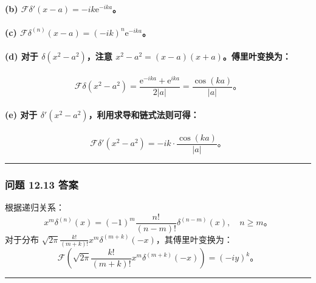 \paragraph{\texorpdfstring{(b)
$\mathcal{F}\delta'(x-a) = -i k \mathrm{e}^{-i k a}$。}{(b) \textbackslash mathcal\{F\}\textbackslash delta\textegsingle(x-a) = -i k \textbackslash mathrm\{e\}\^{}\{-i k a\}。}}

\paragraph{\texorpdfstring{(c)
$\mathcal{F}\delta^{(n)}(x-a) = (-i k)^n \mathrm{e}^{-i k a}$。}{(c) \textbackslash mathcal\{F\}\textbackslash delta\^{}\{(n)\}(x-a) = (-i k)\^{}n \textbackslash mathrm\{e\}\^{}\{-i k a\}。}}

\paragraph{\texorpdfstring{(d) 对于 $\delta(x^2-a^2)$，注意
$x^2-a^2 = (x-a)(x+a)$。傅里叶变换为：}{(d) 对于 \textbackslash delta(x\^{}2-a\^{}2)，注意 x\^{}2-a\^{}2 = (x-a)(x+a)。傅里叶变换为：}}
 $$
\mathcal{F}\delta(x^2-a^2) = \frac{\mathrm{e}^{-i k a} + \mathrm{e}^{i k a}}{2|a|} = \frac{\cos(k a)}{|a|}。
$$
\paragraph{\texorpdfstring{(e) 对于
$\delta'(x^2-a^2)$，利用求导和链式法则可得：}{(e) 对于 \textbackslash delta\textegsingle(x\^{}2-a\^{}2)，利用求导和链式法则可得：}}\label{e-ux5bf9ux4e8e-deltax2-a2ux5229ux7528ux6c42ux5bfcux548cux94feux5f0fux6cd5ux5219ux53efux5f97}
 $$
\mathcal{F}\delta'(x^2-a^2) = -i k \cdot \frac{\cos(k a)}{|a|}。
$$
\begin{center}\rule{0.5\linewidth}{0.5pt}\end{center}

\subsubsection{问题 12.13 答案}

根据递归关系：
 $$
x^m \delta^{(n)}(x) = (-1)^m \frac{n!}{(n-m)!} \delta^{(n-m)}(x), \quad n \geq m。
$$
对于分布
$\sqrt{2 \pi} \frac{k!}{(m+k)!} x^m \delta^{(m+k)}(-x)$，其傅里叶变换为：
 $$
\mathcal{F}\left(\sqrt{2 \pi} \frac{k!}{(m+k)!} x^m \delta^{(m+k)}(-x)\right) = (-i y)^k。
$$
\begin{center}\rule{0.5\linewidth}{0.5pt}\end{center}

